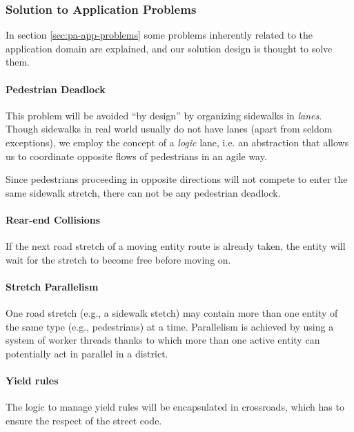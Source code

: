 
\subsubsection{Solution to Application Problems}

In section \ref{sec:pa-app-problems} some problems inherently related to the
application domain are explained, and our solution design is thought to solve
them.

\paragraph{Pedestrian Deadlock}
This problem will be avoided ``by design'' by organizing sidewalks in
\textit{lanes}. Though sidewalks in real world usually do not have lanes (apart
from seldom exceptions), we employ the concept of a \textit{logic} lane, i.e.
an abstraction that allows us to coordinate opposite flows of pedestrians in an
agile way.

Since pedestrians proceeding in opposite directions will not compete to enter
the same sidewalk stretch, there can not be any pedestrian deadlock.

\paragraph{Rear-end Collisions}
If the next road stretch of a moving entity route is already taken, the entity
will wait for the stretch to become free before moving on.

\paragraph{Stretch Parallelism}
One road stretch (e.g., a sidewalk stetch) may contain more than one entity of
the same type (e.g., pedestrians) at a time.
Parallelism is achieved by using a system of worker threads thanks to which
more than one active entity can potentially act in parallel in a district.

\paragraph{Yield rules}
The logic to manage yield rules will be encapsulated in crossroads, which has
to ensure the respect of the street code.


